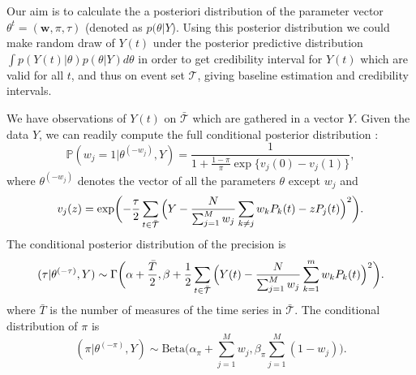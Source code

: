 \documentclass[journal]{IEEEtran}
\newcommand{\wvector}{\mathbf w}
\begin{document}
Our aim is to calculate the a posteriori distribution of the parameter
vector $\theta^t=(\wvector,\pi,\tau)$ (denoted as
$p(\theta|Y$). Using this posterior distribution we could make random
draw of $Y(t)$ under the posterior predictive distribution $\int
p(Y(t) | \theta) p(\theta| Y)d\theta$ in order to get credibility
interval for $Y(t)$ which are valid for all $t$, and thus on event set
$\mathcal{T}$, giving baseline estimation and credibility intervals.

We have observations of $Y(t)$ on $\bar{\mathcal{T}}$ which are
gathered in a vector $Y$.  Given the data $Y$, we can readily compute
the full conditional posterior distribution :
\begin{equation}
  \label{cond:distributionWj}
  {\mathbb P}(w_j = 1 | \theta^{(-w_j)},Y) =
  \frac{1}{1+\frac{1-\pi}{\pi}\exp\{v_j(0)-v_j(1)\}},
\end{equation}
where $\theta^{(-w_j)}$ denotes the vector of all the parameters
$\theta$ except $w_j$ and
\begin{equation*}
  v_j(z) = \exp\biggl(-\frac{\tau}{2}
  \sum_{t\in \bar{\mathcal{T}}}{
    \Bigl(Y - \frac{N}{\sum_{j=1}^{M}{w_j}}\sum_{k \not = j} w_k P_k(t) - z P_j(t)\Bigr)^2 }\biggr).
\end{equation*}
The conditional posterior distribution of the precision is
\begin{equation}
  (\tau | \theta^{(-\tau)},Y)  \sim \Gamma\biggl(\alpha+\frac{\bar T}{2},\beta + \frac{1}{2}\sum_{t\in \bar{\mathcal{T}}}{\Bigl(Y(t) - \frac{N}{\sum_{j=1}^{M}{w_j}}\sum_{k=1}^m w_k P_k(t)\Bigr)^2}\biggl).
\label{cond:distributionTau}
\end{equation}
where $\bar T$ is the number of measures of the time series in
$\bar{\mathcal{T}}$. The conditional distribution of $\pi$ is
\begin{equation}
  (\pi | \theta^{(-\pi)},Y)  \sim \mathrm{Beta}\biggl(\alpha_\pi+\sum_{j=1}^{M}{w_j} ,\beta_\pi\sum_{j=1}^{M}{(1-w_j)}\biggr).\label{cond:distributionPi}
\end{equation}
\end{document}
